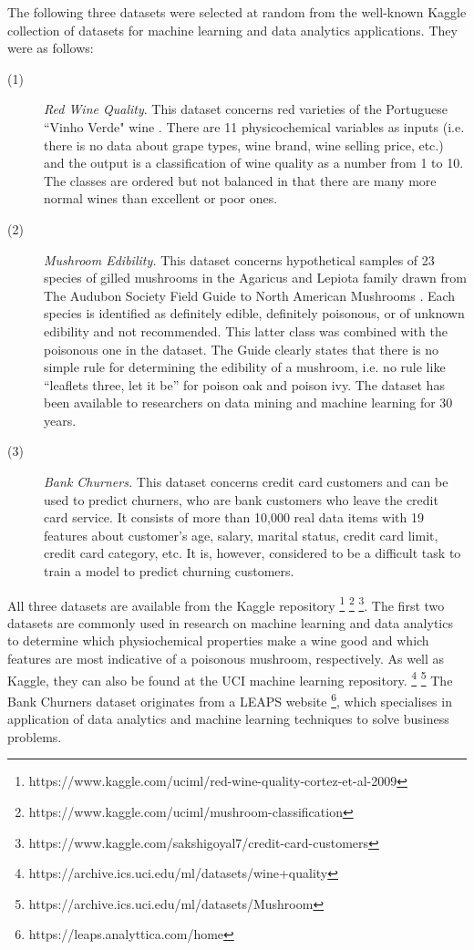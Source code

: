 \documentclass[preprint,1p,authoryear,times]{elsarticle}
\begin{document}
The following three datasets were selected at random from the well-known Kaggle collection of datasets for machine learning and data analytics applications. They were as follows:
\begin{description}
  \item [(1)] \emph{Red Wine Quality}. This dataset concerns red varieties of the Portuguese ``Vinho Verde" wine \citep{RedWinePaper}. There are 11 physicochemical variables as inputs (i.e. there is no data about grape types, wine brand, wine selling price, etc.) and the output is a classification of wine quality as a number from 1 to 10. The classes are ordered but not balanced in that there are many more normal wines than excellent or poor ones. 
  \item [(2)] \emph{Mushroom Edibility.} This dataset concerns hypothetical samples of 23 species of gilled mushrooms in the Agaricus and Lepiota family drawn from The Audubon Society Field Guide to North American Mushrooms \cite{MushroomBook}. Each species is identified as definitely edible, definitely poisonous, or of unknown edibility and not recommended. This latter class was combined with the poisonous one in the dataset. The Guide clearly states that there is no simple rule for determining the edibility of a mushroom, i.e. no rule like ``leaflets three, let it be'' for poison oak and poison ivy. The dataset has been available to researchers on data mining and machine learning for 30 years. 
  \item [(3)] \emph{Bank Churners.} This dataset concerns credit card customers and can be used to predict churners, who are bank customers who leave the credit card service. It consists of more than 10,000 real data items with 19 features about customer's age, salary, marital status, credit card limit, credit card category, etc. It is, however, considered to be a difficult task to train a model to predict churning customers. 
\end{description}

All three datasets are available from the Kaggle repository
\footnote{https://www.kaggle.com/uciml/red-wine-quality-cortez-et-al-2009}
\footnote{https://www.kaggle.com/uciml/mushroom-classification}
\footnote{https://www.kaggle.com/sakshigoyal7/credit-card-customers}.
The first two datasets are commonly used in research on machine learning and data analytics to determine which physiochemical properties make a wine good and which features are most indicative of a poisonous mushroom, respectively. As well as Kaggle, they can also be found at the UCI machine learning repository. \footnote{https://archive.ics.uci.edu/ml/datasets/wine+quality}
\footnote{https://archive.ics.uci.edu/ml/datasets/Mushroom} The Bank Churners dataset originates from a LEAPS website \footnote{https://leaps.analyttica.com/home}, which specialises in application of data analytics and machine learning techniques to solve business problems. 
\end{document}
